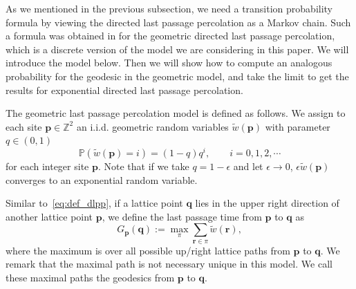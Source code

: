 \documentclass{article}
\numberwithin{equation}{section}
\newcommand{\intZ}{\mathbb{Z}}
\newcommand{\prob}{\mathbb{P}}
\begin{document}
As we mentioned in the previous subsection, we need a transition probability formula by viewing the directed last passage percolation as a Markov chain. Such a formula was obtained in \cite{Johansson10} for the geometric directed last passage percolation, which is a discrete version of the model we are considering in this paper. We will introduce the model below. Then we will show how to compute an analogous probability for the geodesic in the geometric model, and take the limit to get the results for exponential directed last passage percolation.



The geometric last passage percolation model is defined as follows. We assign to each site $\mathbf{p}\in \intZ^2$ an i.i.d. geometric random variables $\tilde w(\mathbf{p})$ with parameter $q\in(0,1)$
\begin{equation}
	\prob\left(\tilde w(\mathbf{p}) = i \right) = (1-q) q^i,\qquad i=0,1,2,\cdots
\end{equation}
for each integer site $\mathbf{p}$. Note that if we take $q=1-\epsilon$ and let $\epsilon\to 0$,  $\epsilon\tilde w(\mathbf{p})$ converges to an exponential random variable.


Similar to~\eqref{eq:def_dlpp}, if a lattice point $\mathbf{q}$ lies in the upper right direction of another lattice point $\mathbf{p}$, we define the last passage time from  $\mathbf{p}$ to $\mathbf{q}$ as
\begin{equation}
	\label{eq:def_dlpp2}
	G_{\mathbf{p}}(\mathbf{q}):=\max_{\pi} \sum_{\mathbf{r}\in\pi} \tilde w(\mathbf{r}),
\end{equation}
where the maximum is over all possible up/right lattice paths from $\mathbf{p}$ to $\mathbf{q}$. We remark that the maximal path is not necessary unique in this model. We call these maximal paths the geodesics from $\mathbf{p}$ to $\mathbf{q}$.
\end{document}
